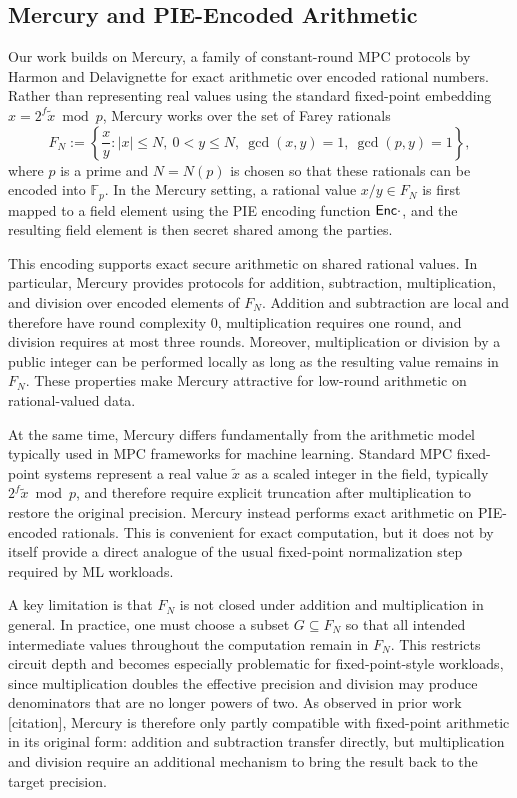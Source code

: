\subsection{Mercury and PIE-Encoded Arithmetic}\label{sec:background-Mercury}

Our work builds on Mercury\cite{Harmon2023Mercury}, a family of constant-round MPC protocols by Harmon and Delavignette for exact arithmetic over encoded rational numbers. Rather than representing real values using the standard fixed-point embedding $x = 2^f \tilde{x} \bmod p$, Mercury works over the set of Farey rationals
\[ F_N := \left\{ \frac{x}{y} : |x| \leq N,\ 0 < y \leq N,\ \gcd(x,y)=1,\ \gcd(p,y)=1 \right\}, \]
where $p$ is a prime and $N = N(p)$ is chosen so that these rationals can be encoded into $\mathbb{F}_p$. In the Mercury setting, a rational value $x/y \in F_N$ is first mapped to a field element using the PIE encoding function $\mathsf{Enc}{\cdot}$, and the resulting field element is then secret shared among the parties.

This encoding supports exact secure arithmetic on shared rational values. In particular, Mercury provides protocols for addition, subtraction, multiplication, and division over encoded elements of $F_N$. Addition and subtraction are local and therefore have round complexity $0$, multiplication requires one round, and division requires at most three rounds. Moreover, multiplication or division by a public integer can be performed locally as long as the resulting value remains in $F_N$. These properties make Mercury attractive for low-round arithmetic on rational-valued data.

At the same time, Mercury differs fundamentally from the arithmetic model typically used in MPC frameworks for machine learning.
Standard MPC fixed-point systems represent a real value $\tilde{x}$ as a scaled integer in the field, typically $2^f \tilde{x} \bmod p$, and therefore require explicit truncation after multiplication to restore the original precision. Mercury instead performs exact arithmetic on PIE-encoded rationals. This is convenient for exact computation, but it does not by itself provide a direct analogue of the usual fixed-point normalization step required by ML workloads. 

A key limitation is that $F_N$ is not closed under addition and multiplication in general. In practice, one must choose a subset $G \subseteq F_N$ so that all intended intermediate values throughout the computation remain in $F_N$. This restricts circuit depth and becomes especially problematic for fixed-point-style workloads, since multiplication doubles the effective precision and division may produce denominators that are no longer powers of two. As observed in prior work \color{blue}[citation]\color{black}, Mercury is therefore only partly compatible with fixed-point arithmetic in its original form: addition and subtraction transfer directly, but multiplication and division require an additional mechanism to bring the result back to the target precision.

